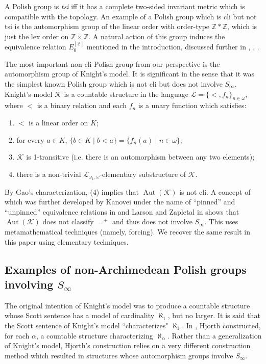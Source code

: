 \documentclass[12pt]{amsart}
\theoremstyle{plain}
\theoremstyle{definition}
\newcommand{\mcK}{\mathcal{K}}
\newcommand{\mcL}{\mathcal{L}}
\DeclareMathOperator{\Aut}{Aut}
\begin{document}
A Polish group is \emph{tsi} iff it has a complete two-sided invariant metric which is compatible with the topology.
An example of a Polish group which is cli but not tsi is the automorphism group of the linear order with order-type $\mathbb{Z} * \mathbb{Z}$, which is just the lex order on $\mathbb{Z} \times \mathbb{Z}$.
A natural action of this group induces the equivalence relation $E_0^{[\mathbb{Z}]}$ mentioned in the introduction, discussed further in \cite{CC2022}, \cite{AllisonTSI}, \cite{AllisonPanagio2021}.

The most important non-cli Polish group from our perspective is the automorphism group of Knight's model.
It is significant in the sense that it was the simplest known Polish group which is not cli but does not involve $S_\infty$.
Knight's model $\mcK$ is a countable structure in the language $\mcL = \{<, f_n\}_{n \in \omega}$, where $<$ is a binary relation and each $f_n$ is a unary function which satisfies:
\begin{enumerate}
    \item $<$ is a linear order on $K$;
    \item for every $a \in K$, $\{b \in K \mid b < a\} = \{f_n(a) \mid n \in \omega\}$;
    \item $\mcK$ is 1-transitive (i.e. there is an automorphism between any two elements);
    \item there is a non-trivial $\mcL_{\omega_1, \omega}$-elementary substructure of $\mcK$.
\end{enumerate}

By Gao's characterization, (4) implies that $\Aut(\mcK)$ is not cli.
A concept of \cite{Hjorth1999} which was further developed by Kanovei under the name of ``pinned'' and ``unpinned'' equivalence relations in \cite{Kanovei2008} and Larson and Zapletal in \cite{LarsonZapletal2020} shows that $\Aut(\mcK)$ does not classify $=^+$ and thus does not involve $S_\infty$.
This uses metamathematical techniques (namely, forcing).
We recover the same result in this paper using elementary techniques.

\subsection{Examples of non-Archimedean Polish groups involving $S_\infty$}

The original intention of Knight's model was to produce a countable structure whose Scott sentence has a model of cardinality $\aleph_1$, but no larger.
It is said that the Scott sentence of Knight's model ``characterizes" $\aleph_1$.
In \cite{Hjorth2002Knight}, Hjorth constructed, for each $\alpha$, a countable structure characterizing $\aleph_\alpha$.
Rather than a generalization of Knight's model, Hjorth's construction relies on a very different construction method which resulted in structures whose automorphism groups involve $S_\infty$.
\end{document}
